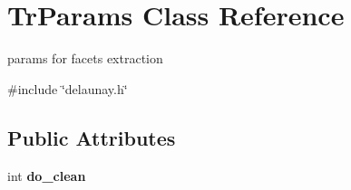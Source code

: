 \hypertarget{classTrParams}{
\section{TrParams Class Reference}
\label{classTrParams}
}


params for facets extraction  




{\ttfamily \#include \char`\"{}delaunay.h\char`\"{}}

\subsection*{Public Attributes}
\begin{DoxyCompactItemize}
\item 
\hypertarget{classTrParams_a6e6a459aef7cb1acd82415279855aaa1}{
int {\bfseries do\_\-clean}}
\label{classTrParams_a6e6a459aef7cb1acd82415279855aaa1}


\end{DoxyCompactItemize}
